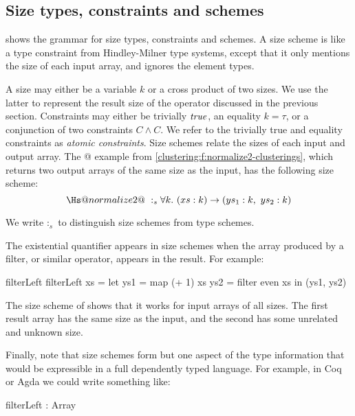 \newcommand{\constr}[1]{\llbracket #1 \rrbracket}


\subsection{Size types, constraints and schemes}
\label{clustering:s:SizeTypes}
 shows the grammar for size types, constraints and schemes. A size scheme is like a type constraint from Hindley-Milner type systems, except that it only mentions the size of each input array, and ignores the element types.

A size may either be a variable $k$ or a cross product of two sizes.
We use the latter to represent the result size of the \Hs@cross@ operator discussed in the previous section.
Constraints may either be trivially $\mathit{true}$, an equality $k = \tau$, or a conjunction of two constraints $C \wedge C$.
We refer to the trivially true and equality constraints as \emph{atomic constraints}.
Size schemes relate the sizes of each input and output array.
The @ example from \cref{clustering:f:normalize2-clusterings}, which returns two output arrays of the same size as the input, has the following size scheme:
$$
\Hs@normalize2@ ~:_s \forall k.~ (xs : k) \to (ys_1 : k,~ ys_2 : k)
$$

We write $:_s$ to distinguish size schemes from type schemes.

The existential quantifier appears in size schemes when the array produced by a filter, or similar operator, appears in the result.
For example:
\begin{haskell}
filterLeft %
filterLeft xs
  = let ys1 = map (+ 1)   xs
        ys2 = filter even xs
    in (ys1, ys2)
\end{haskell}

The size scheme of \Hs@filterLeft@ shows that it works for input arrays of all sizes.
The first result array has the same size as the input, and the second has some unrelated and unknown size.

Finally, note that size schemes form but one aspect of the type information that would be expressible in a full dependently typed language.
For example, in Coq or Agda we could write something like:
\begin{haskell}
filterLeft : %
  Array %
\end{haskell}

